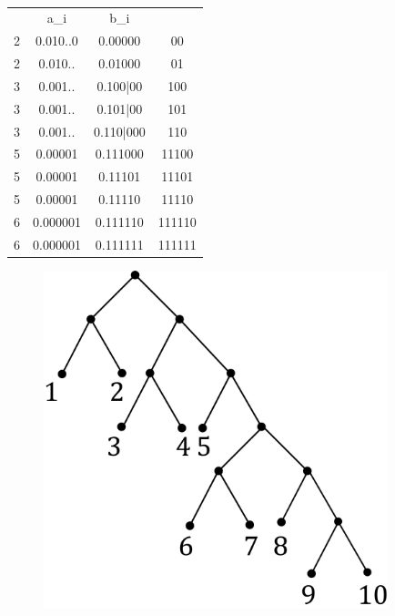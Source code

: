 \documentclass[discrete.tex]{subfiles}
\begin{document}
  \begin{example} \
    \begin{tabular}{c|c|c|c}
      & a_i & b_i & \\
      2 & 0.010..0 & 0.00000 & 00\\
      2 & 0.010.. & 0.01000 & 01\\
      3 & 0.001.. & 0.100|00 & 100\\
      3 & 0.001.. & 0.101|00 & 101\\
      3 & 0.001.. & 0.110|000 & 110\\
      5 & 0.00001 & 0.111000 & 11100\\
      5 & 0.00001 & 0.11101 & 11101\\
      5 & 0.00001 & 0.11110 & 11110\\
      6 & 0.000001 & 0.111110 & 111110\\
      6 & 0.000001 & 0.111111 & 111111
    \end{tabular}

    \begin{figure}[H]
        \includegraphics[width=10cm]{pics/18_1.png}
        \centering
    \end{figure}
  \end{example}
\end{document}
